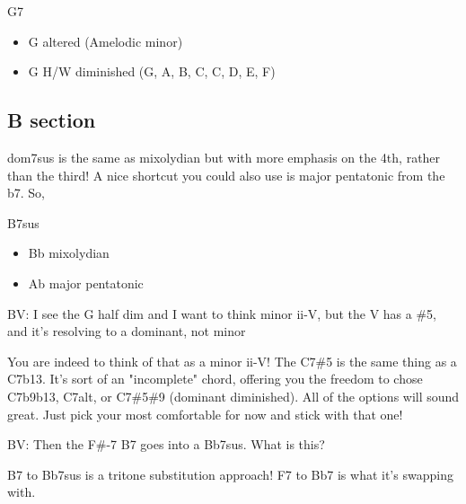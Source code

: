 \documentclass[11pt]{article}
\begin{document}
G7
\begin{itemize}
\item G altered (A\flat   melodic minor)
\item G H/W diminished (G, A, B\flat, C, C\sharp, D\sharp, E, F\sharp)
\end{itemize}

\subsection{B section}
\label{sec:orgfed8b3d}

dom7sus is the same as mixolydian but with more emphasis on the 4th, rather than the third! A nice shortcut you could also use is major pentatonic from the b7. So,

B\flat 7sus
\begin{itemize}
\item Bb mixolydian
\item Ab major pentatonic
\end{itemize}

BV: I see the G half dim and I want to think minor ii-V, but the V has a \#5, and it’s resolving to a dominant, not minor

You are indeed to think of that as a minor ii-V! The C7\#5 is the same thing as a C7b13. It's sort of an "incomplete" chord, offering you the freedom to chose C7b9b13, C7alt, or C7\#5\#9 (dominant diminished). All of the options will sound great. Just pick your most comfortable for now and stick with that one!

BV: Then the F\#-7 B7 goes into a Bb7sus. What is this?

B7 to Bb7sus is a tritone substitution approach! F7 to Bb7 is what it's swapping with.
\end{document}
